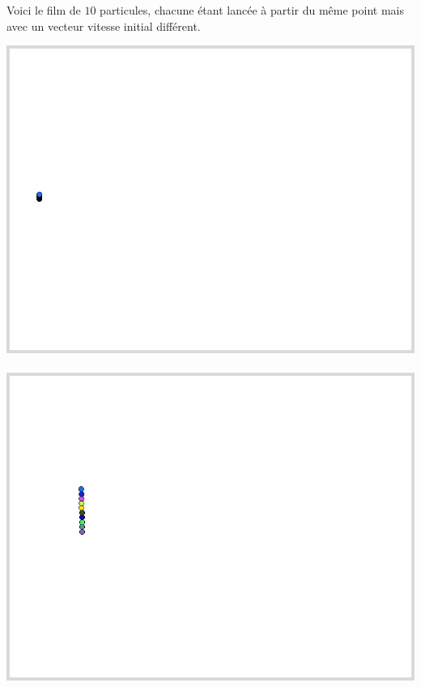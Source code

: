 \documentclass[11pt,class=report,crop=false]{standalone}
\begin{document}
\begin{activite}


Voici le \og{}film\fg{} de $10$ particules, chacune étant lancée à partir du même point mais avec un vecteur vitesse initial différent.

\begin{center}
\includegraphics[scale=\myscale,scale=0.18]{ecran-mouvement-001}\ 
\includegraphics[scale=\myscale,scale=0.18]{ecran-mouvement-010}\ 

\end{center}
\end{activite}
\end{document}

